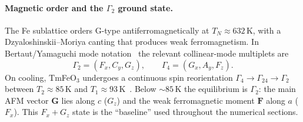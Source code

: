 \documentclass[11pt,a4paper]{article}
\newcommand{\ve}[1]{\boldsymbol{#1}}
\begin{document}
\paragraph{Magnetic order and the $\Gamma_2$ ground state.}
The Fe sublattice orders G-type antiferromagnetically at
$T_N\approx 632\,\mathrm K$, with a Dzyaloshinskii--Moriya canting that
produces weak ferromagnetism.  In Bertaut/Yamaguchi mode
notation~\cite{Yamaguchi} the relevant collinear-mode multiplets are
\begin{equation}
  \Gamma_2=(F_x,C_y,G_z),\qquad
  \Gamma_4=(G_x,A_y,F_z).
\end{equation}
On cooling, TmFeO$_3$ undergoes a continuous spin reorientation
$\Gamma_4\!\to\!\Gamma_{24}\!\to\!\Gamma_2$ between $T_2\approx85\,\mathrm K$
and $T_1\approx93\,\mathrm K$~\cite{Zhang2016,Kimel2004}.  Below
$\sim85\,\mathrm K$ the equilibrium is $\Gamma_2$: the main AFM vector $\ve G$
lies along $c$ ($G_z$) and the weak ferromagnetic moment $\ve F$ along $a$
($F_x$).  This $F_x+G_z$ state is the ``baseline'' used throughout the
numerical sections.
\end{document}
